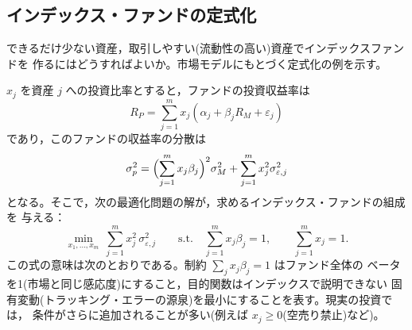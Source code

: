 \subsection{インデックス・ファンドの定式化}

できるだけ少ない資産，取引しやすい(流動性の高い)資産でインデックスファンドを
作るにはどうすればよいか。市場モデルにもとづく定式化の例を示す。

$x_j$ を資産 $j$ への投資比率とすると，ファンドの投資収益率は
\begin{equation}
R_P = \sum_{j=1}^{m} x_j(\alpha_j + \beta_j R_M + \varepsilon_j)
\end{equation}
であり，このファンドの収益率の分散は
\begin{equation}
\sigma_p^2 = \Bigl(\sum_{j=1}^{m}x_j\beta_j\Bigr)^2\sigma_M^2
+ \sum_{j=1}^{m}x_j^2\sigma_{\varepsilon,j}^2
\end{equation}
となる。そこで，次の最適化問題の解が，求めるインデックス・ファンドの組成を
与える：
\begin{equation}
\min_{x_1,\dots,x_m}\ \sum_{j=1}^{m}x_j^2\,\sigma_{\varepsilon,j}^2
\qquad\text{s.t.}\quad
\sum_{j=1}^{m}x_j\beta_j = 1,\qquad \sum_{j=1}^{m}x_j = 1.
\label{eq:index-opt}
\end{equation}
この式の意味は次のとおりである。制約 $\sum_j x_j\beta_j = 1$ はファンド全体の
ベータを1(市場と同じ感応度)にすること，目的関数はインデックスで説明できない
固有変動(トラッキング・エラーの源泉)を最小にすることを表す。現実の投資では，
条件がさらに追加されることが多い(例えば $x_j\geq 0$(空売り禁止)など)。

